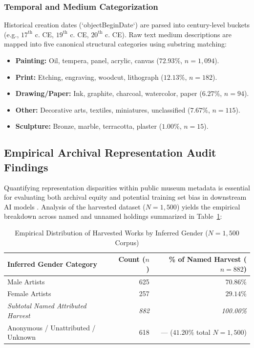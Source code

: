 \documentclass[pdflatex,sn-mathphys-num]{sn-jnl}%
\theoremstyle{thmstyleone}%
\theoremstyle{thmstyletwo}%
\theoremstyle{thmstylethree}%
\begin{document}
\subsubsection{Temporal and Medium Categorization}
Historical creation dates (`objectBeginDate`) are parsed into century-level buckets (e.g., $17^{\text{th}}$ c. CE, $19^{\text{th}}$ c. CE, $20^{\text{th}}$ c. CE). Raw text medium descriptions are mapped into five canonical structural categories using substring matching:
\begin{itemize}
    \item \textbf{Painting:} Oil, tempera, panel, acrylic, canvas ($72.93\%$, $n=1{,}094$).
    \item \textbf{Print:} Etching, engraving, woodcut, lithograph ($12.13\%$, $n=182$).
    \item \textbf{Drawing/Paper:} Ink, graphite, charcoal, watercolor, paper ($6.27\%$, $n=94$).
    \item \textbf{Other:} Decorative arts, textiles, miniatures, unclassified ($7.67\%$, $n=115$).
    \item \textbf{Sculpture:} Bronze, marble, terracotta, plaster ($1.00\%$, $n=15$).
\end{itemize}

\subsection{Empirical Archival Representation Audit Findings}
Quantifying representation disparities within public museum metadata is essential for evaluating both archival equity and potential training set bias in downstream AI models \cite{topaz2019diversity, meier2021gender, noorthuis2020bias}. Analysis of the harvested dataset ($N=1,500$) yields the empirical breakdown across named and unnamed holdings summarized in Table~\ref{tab:gender_representation}:

\begin{table}[h]
\caption{Empirical Distribution of Harvested Works by Inferred Gender ($N=1,500$ Corpus)}
\label{tab:gender_representation}
\centering
\small
\begin{tabular}{lrr}
\toprule
\textbf{Inferred Gender Category} & \textbf{Count ($n$)} & \textbf{\% of Named Harvest ($n=882$)} \\
\midrule
Male Artists & 625 & $70.86\%$ \\
Female Artists & 257 & $29.14\%$ \\
\midrule
\textit{Subtotal Named Attributed Harvest} & \textit{882} & \textit{100.00\%} \\
Anonymous / Unattributed / Unknown & 618 & --- ($41.20\%$ total $N=1,500$) \\
\bottomrule
\end{tabular}
\end{table}
\end{document}
